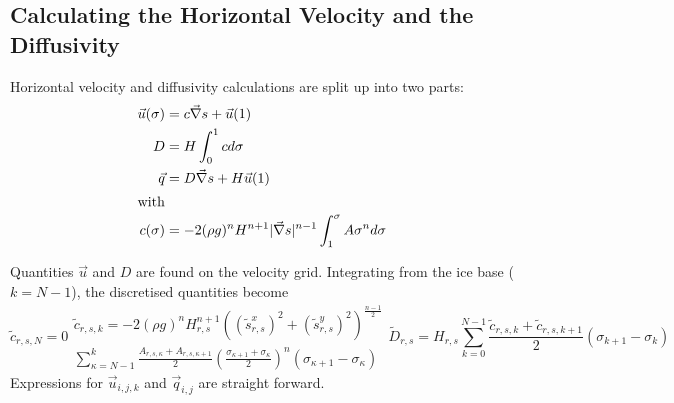 \subsection{Calculating the Horizontal Velocity and the Diffusivity}
Horizontal velocity and diffusivity calculations are split up into two parts:
\begin{subequations}
  \label{kin.eq.horiz_diffusivity}
  \begin{align}
    \vec u(\sigma)&=c\vec\nabla s+\vec u(1)\\
    D &=H\int_0^1cd\sigma\\
    \vec q&=D\vec\nabla s+H\vec u(1)\\
    \intertext{with}
    c(\sigma)&=-2(\rho g)^nH^{n+1}|\vec\nabla s|^{n-1}\int_1^\sigma A\sigma^nd\sigma
  \end{align}
\end{subequations}

Quantities $\vec u$ and $D$ are found on the velocity grid. Integrating from the ice base ($k=N-1$), the discretised quantities become
\begin{subequations}
  \begin{equation}
    \tilde{c}_{r,s,N}=0
  \end{equation}
  \begin{multline}
    \tilde{c}_{r,s,k}=-2(\rho g)^nH_{r,s}^{n+1}\left(({\tilde{s}^x_{r,s}})^2+({\tilde{s}^y_{r,s}})^2\right)^{\frac{n-1}{2}}\\
    \sum_{\kappa=N-1}^k\frac{A_{r,s,\kappa}+A_{r,s,\kappa+1}}2 \left(\frac{\sigma_{\kappa+1}+\sigma_\kappa}2\right)^n(\sigma_{\kappa+1}-\sigma_\kappa)
  \end{multline}
  \begin{equation}
    \tilde{D}_{r,s}=H_{r,s}\sum_{k=0}^{N-1}\frac{\tilde{c}_{r,s,k}+\tilde{c}_{r,s,k+1}}2(\sigma_{k+1}-\sigma_k)
  \end{equation}
\end{subequations}
Expressions for $\vec{u}_{i,j,k}$ and $\vec{q}_{i,j}$ are straight forward.


